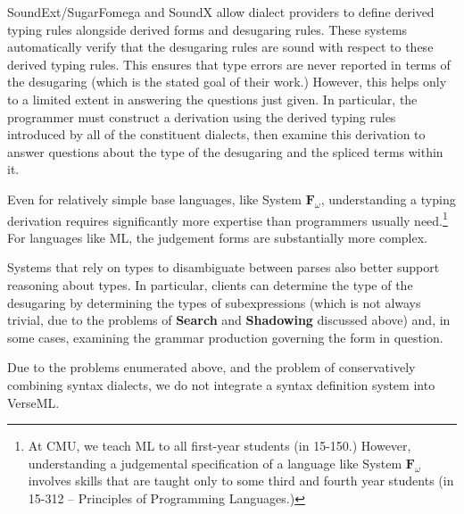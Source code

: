 {\begin{enumerate}
SoundExt/SugarFomega \cite{conf/popl/LorenzenE16} and SoundX \cite{conf/sle/RitschelE15} allow dialect providers to define derived typing rules alongside derived forms and desugaring rules. These systems automatically verify that the desugaring rules are sound with respect to these derived typing rules. This ensures that type errors are never reported in terms of the desugaring (which is the stated goal of their work.) However, this helps only to a limited extent in answering the questions just given. In particular, the programmer must construct a derivation using the derived typing rules introduced by all of the constituent dialects, then examine this derivation to answer questions about the type of the desugaring and the spliced terms within it. 

Even for relatively simple base languages, like System $\mathbf{F}_\omega$, understanding a typing derivation requires significantly more expertise than programmers usually need.\footnote{At CMU, we teach ML to all first-year students (in 15-150.) However, understanding a judgemental specification of a language like System $\mathbf{F}_\omega$ involves skills that are taught only to some third and fourth year students (in 15-312 -- Principles of Programming Languages.)} For languages like ML, the judgement forms are substantially more complex. 

Systems that rely on types to disambiguate between parses also better support reasoning about types. In particular, clients can determine the type of the desugaring by determining the types of subexpressions (which is not always trivial, due to the problems of \textbf{Search} and \textbf{Shadowing} discussed above) and, in some cases, examining the grammar production governing the form in question.
\end{enumerate}


Due to the problems enumerated above, and the problem of conservatively combining syntax dialects, we do not integrate a syntax definition system into VerseML.%

}
